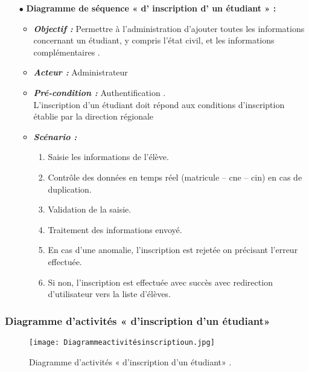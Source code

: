 \begin{itemize}
	\item[$\bullet$] \textbf{Diagramme de séquence « d' inscription d' un étudiant » :} 
	\medskip
	\begin{itemize}
		\item \textit{\textbf{Objectif :}} Permettre à l'administration d'ajouter toutes les informations
		concernant un étudiant, y compris l’état civil, et les
		informations complémentaires .	
		\item \textit{\textbf{Acteur :}} Administrateur	
		\item \textit{\textbf{Pré-condition  :}} Authentification .\\
		L’inscription d’un étudiant doit répond aux conditions d’inscription établie par
		la direction régionale
		\item \textit{\textbf{Scénario :}}
		\begin{enumerate}
		\item Saisie les informations de l’élève.
		\item Contrôle des données en temps réel (matricule – cne – cin) en cas de duplication.
		\item Validation de la saisie.
		\item Traitement des informations envoyé.
		\item En cas d’une anomalie, l’inscription est rejetée on précisant l’erreur effectuée.
		\item Si non, l’inscription est effectuée avec succès avec redirection d’utilisateur vers la
			liste d’élèves.
		\end{enumerate}
	\end{itemize}
\end{itemize}	
\bigskip

















\subsubsection{Diagramme d'activités « d'inscription d'un étudiant» }
\begin{figure}[ht]
	\centering
	\texttt{[image: Diagrammeactivitésinscriptioun.jpg]}
	\caption{Diagramme d'activités « d'inscription d'un étudiant» .}
	\label{fig:Diagramme d' activités  d' inscription d'un étudiant   }
\end{figure}
\FloatBarrier

